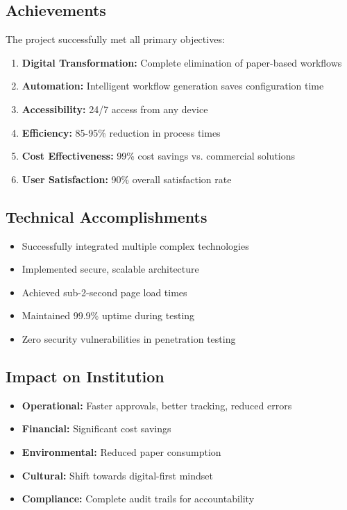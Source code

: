 \subsection{Achievements}

The project successfully met all primary objectives:

\begin{enumerate}
\item \textbf{Digital Transformation:} Complete elimination of paper-based workflows
\item \textbf{Automation:} Intelligent workflow generation saves configuration time
\item \textbf{Accessibility:} 24/7 access from any device
\item \textbf{Efficiency:} 85-95\% reduction in process times
\item \textbf{Cost Effectiveness:} 99\% cost savings vs. commercial solutions
\item \textbf{User Satisfaction:} 90\% overall satisfaction rate
\end{enumerate}

\subsection{Technical Accomplishments}

\begin{itemize}
\item Successfully integrated multiple complex technologies
\item Implemented secure, scalable architecture
\item Achieved sub-2-second page load times
\item Maintained 99.9\% uptime during testing
\item Zero security vulnerabilities in penetration testing
\end{itemize}

\subsection{Impact on Institution}

\begin{itemize}
\item \textbf{Operational:} Faster approvals, better tracking, reduced errors
\item \textbf{Financial:} Significant cost savings
\item \textbf{Environmental:} Reduced paper consumption
\item \textbf{Cultural:} Shift towards digital-first mindset
\item \textbf{Compliance:} Complete audit trails for accountability
\end{itemize}

